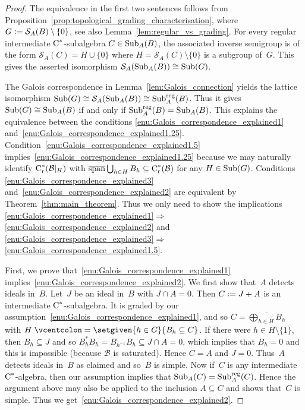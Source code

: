 \documentclass[a4paper]{amsart}
\theoremstyle{plain}
\theoremstyle{definition}
\theoremstyle{remark}
\numberwithin{theorem}{section}
\numberwithin{equation}{section}
\DeclareMathOperator*{\clsp}{\overline{span}} %
\newcommand*{\nb}{\nobreakdash}
\newcommand*{\red}{\mathrm{r}}%
\newcommand*{\Cst}{\textup C^*}%
\newcommand*{\Slice}{\mathcal S}%
\newcommand*{\Sub}{\textup{Sub}}%
\newcommand*{\B}{\mathcal B}%
\newcommand*{\defeq}{\mathrel{\vcentcolon=}}%
\begin{document}
\begin{proof}
  The equivalence in the first two sentences follows from
  Proposition~\ref{prop:topological_grading_characterisation}, where
  \(G\defeq \Slice_A(B)\setminus \{0\}\), see also
  Lemma~\ref{lem:regular_vs_grading}.
  For every regular intermediate \(\Cst\)\nb-subalgebra \(C\in
  \Sub_A(B)\), the associated inverse semigroup is of the form
  \(\Slice_A(C)= H\cup \{0\}\) where \(H=\Slice_A(C)\setminus \{0\}\)
  is a subgroup of~\(G\).
  This gives the asserted isomorphism \(\Slice_A(\Sub_A(B))\cong
  \Sub(G)\).

  The Galois correspondence in Lemma~\ref{lem:Galois_connection}
  yields the lattice isomorphism \(\Sub(G)\cong
  \Slice_A(\Sub_A(B))\cong\Sub_A^{\text{reg}}(B)\).
  Thus it gives \(\Sub(G)\cong \Sub_A(B)\) if and only if
  \(\Sub_A^{\text{reg}}(B)=\Sub_A(B)\).
  This explains the equivalence between the conditions
  \ref{enu:Galois_correspondence_explained1}
  and~\ref{enu:Galois_correspondence_explained1.25}.
  Condition~\ref{enu:Galois_correspondence_explained1.5}
  implies~\ref{enu:Galois_correspondence_explained1.25} because we may
  naturally identify \(\Cst_\red(\B|_H)\) with \(\clsp\bigcup_{h\in H}
  B_h\subseteq \Cst_\red(\B)\) for any \(H\in \Sub(G)\).
  Conditions \ref{enu:Galois_correspondence_explained3}
  and~\ref{enu:Galois_correspondence_explained2} are equivalent by
  Theorem~\ref{thm:main_theorem}.
  Thus we only need to show the implications
  \ref{enu:Galois_correspondence_explained1}\(\Rightarrow
  \)\ref{enu:Galois_correspondence_explained2} and
  \ref{enu:Galois_correspondence_explained3}\(\Rightarrow
  \)\ref{enu:Galois_correspondence_explained1.5}.

  First, we prove that~\ref{enu:Galois_correspondence_explained1}
  implies~\ref{enu:Galois_correspondence_explained2}.
  We first show that~\(A\) detects ideals in~\(B\).
  Let~\(J\) be an ideal in~\(B\) with \(J\cap A=0\).
  Then  \(C\defeq J+A\) is an intermediate \(\Cst\)\nb-subalgebra.
  It is graded by our
  assumption~\ref{enu:Galois_correspondence_explained1}, and so
  \(C=\overline{\bigoplus_{h\in H} B_h}\) with \(H\defeq
  \setgiven{h\in G}{B_h\subseteq C}\).
  If there were \(h\in H\setminus\{1\}\), then \(B_h\subseteq J\) and
  so \(B_{h}^*B_{h}=B_{h^{-1}} B_h\subseteq J\cap A=0\), which implies
  that \(B_h=0\) and this  is impossible (because \(\B\) is saturated).
  Hence \(C=A\) and \(J=0\).
  Thus~\(A\) detects ideals in~\(B\) as claimed and so~\(B\) is
  simple.
  Now if~\(C\) is any intermediate \(\Cst\)\nb-algebra, then our
  assumption implies that  \(\Sub_A(C)=\Sub_A^{\textup{reg}}(C)\).
  Hence the argument above may also be applied to the inclusion \(A\subseteq
  C\) and shows that~\(C\) is simple.
  Thus we get~\ref{enu:Galois_correspondence_explained2}.


\end{proof}
\end{document}
